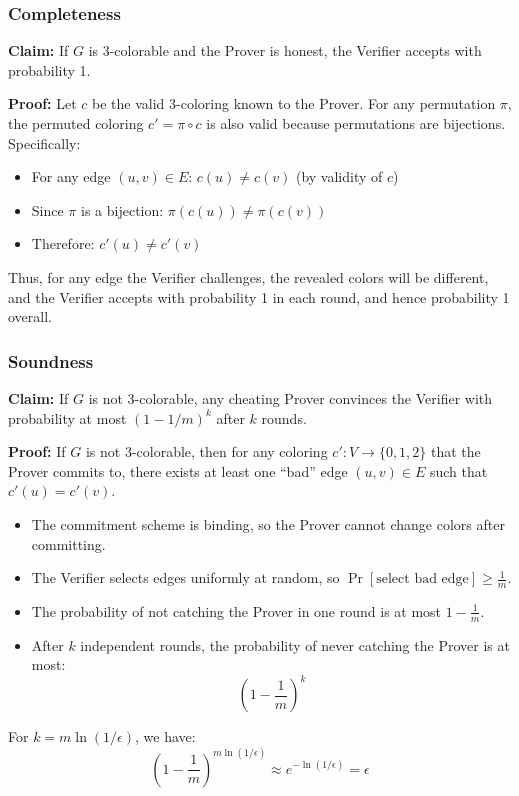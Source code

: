 \documentclass[11pt]{article}
\begin{document}
\subsubsection{Completeness}
\textbf{Claim:} If $G$ is 3-colorable and the Prover is honest, the Verifier accepts with probability 1.

\textbf{Proof:} Let $c$ be the valid 3-coloring known to the Prover. For any permutation $\pi$, the permuted coloring $c' = \pi \circ c$ is also valid because permutations are bijections. Specifically:
\begin{itemize}
    \item For any edge $(u, v) \in E$: $c(u) \neq c(v)$ (by validity of $c$)
    \item Since $\pi$ is a bijection: $\pi(c(u)) \neq \pi(c(v))$
    \item Therefore: $c'(u) \neq c'(v)$
\end{itemize}

Thus, for any edge the Verifier challenges, the revealed colors will be different, and the Verifier accepts with probability 1 in each round, and hence probability 1 overall.

\subsubsection{Soundness}
\textbf{Claim:} If $G$ is not 3-colorable, any cheating Prover convinces the Verifier with probability at most $(1 - 1/m)^k$ after $k$ rounds.

\textbf{Proof:} If $G$ is not 3-colorable, then for any coloring $c': V \to \{0, 1, 2\}$ that the Prover commits to, there exists at least one ``bad'' edge $(u, v) \in E$ such that $c'(u) = c'(v)$.

\begin{itemize}
    \item The commitment scheme is binding, so the Prover cannot change colors after committing.
    \item The Verifier selects edges uniformly at random, so $\Pr[\text{select bad edge}] \geq \frac{1}{m}$.
    \item The probability of not catching the Prover in one round is at most $1 - \frac{1}{m}$.
    \item After $k$ independent rounds, the probability of never catching the Prover is at most:
    \[
    \left(1 - \frac{1}{m}\right)^k
    \]
\end{itemize}

For $k = m \ln(1/\epsilon)$, we have:
\[
\left(1 - \frac{1}{m}\right)^{m \ln(1/\epsilon)} \approx e^{-\ln(1/\epsilon)} = \epsilon
\]
\end{document}
